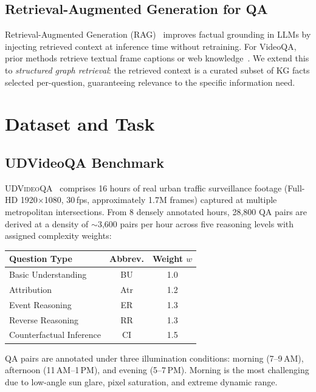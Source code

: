 \documentclass[10pt,conference,compsoc]{IEEEtran}
\newcommand{\dataset}{\textsc{UDVideoQA}}
\begin{document}
\subsection{Retrieval-Augmented Generation for QA}

Retrieval-Augmented Generation (RAG)~\cite{lewis2020rag} improves
factual grounding in LLMs by injecting retrieved context at
inference time without retraining.
For VideoQA, prior methods retrieve textual frame captions or
web knowledge~\cite{yang2022zeroshot}.
We extend this to \emph{structured graph retrieval}: the retrieved
context is a curated subset of KG facts selected per-question,
guaranteeing relevance to the specific information need.


\section{Dataset and Task}
\label{sec:dataset}

\subsection{UDVideoQA Benchmark}

\dataset{}~\cite{udvideoqa2026} comprises 16 hours of
real urban traffic surveillance footage (Full-HD 1920$\times$1080,
30\,fps, approximately 1.7M frames) captured at multiple
metropolitan intersections.
From 8 densely annotated hours, 28{,}800 QA pairs are derived
at a density of $\sim$3{,}600 pairs per hour across five reasoning
levels with assigned complexity weights:

\begin{center}
\small
\begin{tabular}{lcc}
\toprule
\textbf{Question Type} & \textbf{Abbrev.} & \textbf{Weight $w$} \\
\midrule
Basic Understanding     & BU  & 1.0 \\
Attribution             & Atr & 1.2 \\
Event Reasoning         & ER  & 1.3 \\
Reverse Reasoning       & RR  & 1.3 \\
Counterfactual Inference& CI  & 1.5 \\
\bottomrule
\end{tabular}
\end{center}

QA pairs are annotated under three illumination conditions:
morning (7--9\,AM), afternoon (11\,AM--1\,PM), and evening
(5--7\,PM).
Morning is the most challenging due to low-angle sun glare,
pixel saturation, and extreme dynamic range.
\end{document}
